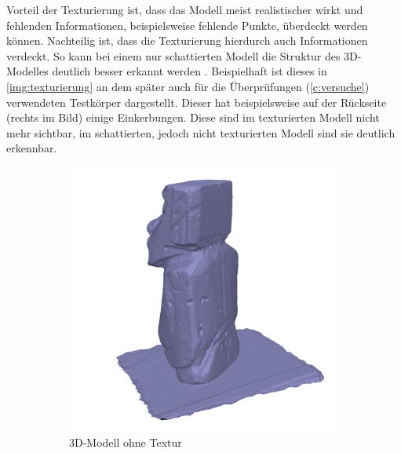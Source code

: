 \documentclass[./00PhotoBox.tex]{subfiles}
\begin{document}
Vorteil der Texturierung ist, dass das Modell meist realistischer wirkt und fehlenden Informationen, beispielsweise fehlende Punkte, überdeckt werden können. Nachteilig ist, dass die Texturierung hierdurch auch Informationen verdeckt. So kann bei einem nur schattierten Modell die Struktur des 3D-Modelles deutlich besser erkannt werden \citep[S. 702]{luhmann}. Beispielhaft ist dieses in \autoref{img:texturierung} an dem später auch für die Überprüfungen (\autoref{c:versuche}) verwendeten Testkörper dargestellt. Dieser hat beispielsweise auf der Rückseite (rechts im Bild) einige Einkerbungen. Diese sind im texturierten Modell nicht mehr sichtbar, im schattierten, jedoch nicht texturierten Modell sind sie deutlich erkennbar.

\begin{figure}
    \centering
    \begin{subfigure}{0.49\textwidth}
        \includegraphics[width=1\linewidth]{img/solid.jpg}
        \centering
        \caption{3D-Modell ohne Textur} %
        \label{img:ohne_textur} %
    \end{subfigure}
    \begin{subfigure}{0.49\textwidth}

\end{subfigure}
\end{figure}
\end{document}
